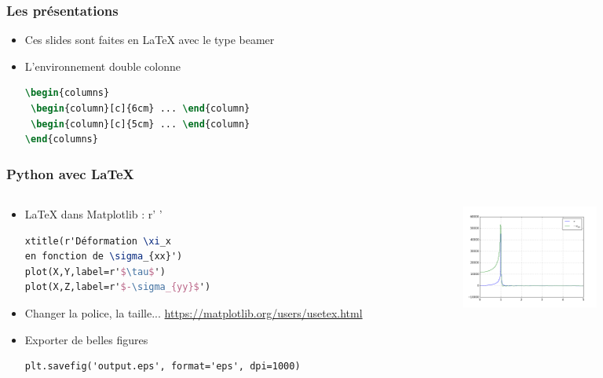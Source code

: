 \documentclass{beamer}
\begin{document}
\begin{frame}[fragile]
    \frametitle{Les présentations}
    \begin{itemize}
        \item<1-> Ces slides sont faites en LaTeX avec le type beamer
        
        \item<2-> L'environnement double colonne
        \begin{lstlisting}[language=TeX]
\begin{columns}
 \begin{column}[c]{6cm} ... \end{column}
 \begin{column}[c]{5cm} ... \end{column}
\end{columns}
        \end{lstlisting}
    \end{itemize}
\end{frame}

\begin{frame}[fragile]
    \frametitle{Python avec LaTeX}
\begin{columns}
    \begin{column}[c]{8.4cm}
    \begin{itemize}
        \item<1-> LaTeX dans Matplotlib : r' '
        \begin{lstlisting}[language=TeX]
xtitle(r'Déformation \xi_x 
en fonction de \sigma_{xx}')
plot(X,Y,label=r'$\tau$')
plot(X,Z,label=r'$-\sigma_{yy}$')
        \end{lstlisting}
        \item<2-> Changer la police, la taille... 
        \url{https://matplotlib.org/users/usetex.html}
        \item<3-> Exporter de belles figures
        \begin{lstlisting}[language=TeX]
plt.savefig('output.eps', format='eps', dpi=1000)
        \end{lstlisting}
    \end{itemize}

    \end{column}
    \begin{column}[c]{4.5cm}
	\includegraphics[width=4.5cm]{figure.png}
    \end{column}
  \end{columns}
\end{frame}
\end{document}
